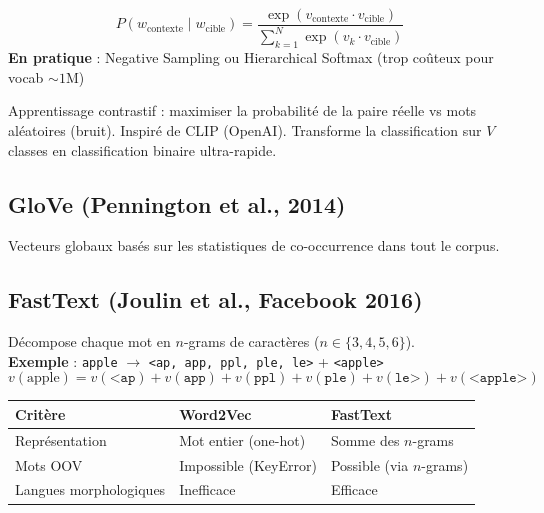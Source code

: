 \documentclass[a4paper,10pt]{article}
\begin{document}
\begin{formulebox}
\[
P(w_{\text{contexte}} \mid w_{\text{cible}}) = \frac{\exp(v_{\text{contexte}} \cdot v_{\text{cible}})}{\sum_{k=1}^{N} \exp(v_k \cdot v_{\text{cible}})}
\]
\textbf{En pratique} : Negative Sampling ou Hierarchical Softmax (trop coûteux pour vocab $\sim 1$M)
\end{formulebox}

\begin{keybox}
Apprentissage contrastif : maximiser la probabilité de la paire réelle vs mots aléatoires (bruit). Inspiré de CLIP (OpenAI). Transforme la classification sur $V$ classes en classification binaire ultra-rapide.
\end{keybox}

\subsection{GloVe (Pennington et al., 2014)}
Vecteurs globaux basés sur les statistiques de co-occurrence dans tout le corpus.

\subsection{FastText (Joulin et al., Facebook 2016)}

\begin{definitionbox}
Décompose chaque mot en $n$-grams de caractères ($n \in \{3, 4, 5, 6\}$).\\
\textbf{Exemple} : \texttt{apple} $\rightarrow$ \texttt{<ap, app, ppl, ple, le>} + \texttt{<apple>}\\
\[
v(\text{apple}) = v(\texttt{<ap}) + v(\texttt{app}) + v(\texttt{ppl}) + v(\texttt{ple}) + v(\texttt{le>}) + v(\texttt{<apple>})
\]
\end{definitionbox}

\begin{center}
\small
\begin{tabular}{lll}
\toprule
\textbf{Critère} & \textbf{Word2Vec} & \textbf{FastText} \\
\midrule
Représentation & Mot entier (one-hot) & Somme des $n$-grams \\
Mots OOV & Impossible (KeyError) & Possible (via $n$-grams) \\
Langues morphologiques & Inefficace & Efficace \\
\bottomrule
\end{tabular}
\end{center}
\end{document}
